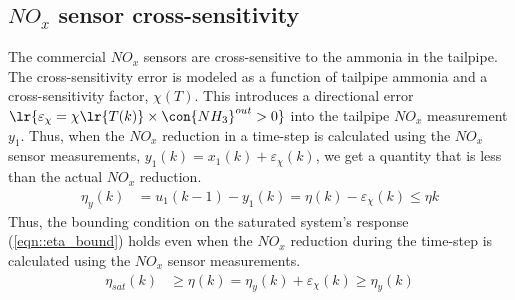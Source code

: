 \subsection{$NO_x$ sensor cross-sensitivity}
The commercial $NO_x$ sensors are cross-sensitive to the ammonia in the tailpipe. The cross-sensitivity error is modeled as a function of tailpipe ammonia and a cross-sensitivity factor, $\chi(T)$.
This introduces a directional error $\lr{\varepsilon_\chi= \chi\lr{T(k)} \times \con{NH_3}^{out}>0}$ into the tailpipe $NO_x$ measurement $y_1$. Thus, when the $NO_x$ reduction in a time-step is calculated using the $NO_x$ sensor measurements, $y_1(k) = x_1(k) + \varepsilon_{\chi}(k)$, we get a quantity that is less than the actual $NO_x$ reduction.
\begin{align}
        \eta_y(k) &= u_1(k-1) - y_1(k) =  \eta(k) - \varepsilon_\chi(k) \leq \eta{k} \label{eqn::cross_meas}
\end{align}
Thus, the bounding condition on the saturated system's response (\ref{eqn::eta_bound}) holds even when the $NO_x$ reduction during the time-step is calculated using the $NO_x$ sensor measurements.
\begin{align}
        \eta_{sat}(k) &\geq \eta(k) = \eta_y(k)+\varepsilon_\chi(k) \geq \eta_y(k) \label{eqn::eta_y_bound}
\end{align}
